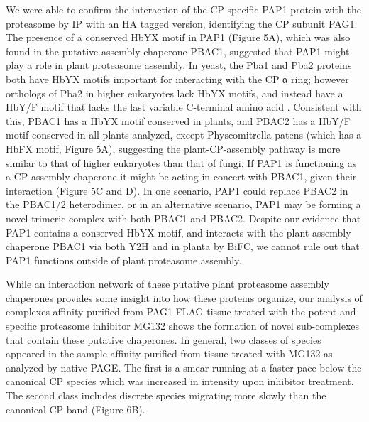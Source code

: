 We were able to confirm the interaction of the CP-specific PAP1 protein with the proteasome by IP with an HA tagged version, identifying the CP subunit PAG1. The presence of a conserved HbYX motif in PAP1 (Figure 5A), which was also found in the putative assembly chaperone PBAC1, suggested that PAP1 might play a role in plant proteasome assembly. In yeast, the Pba1 and Pba2 proteins both have HbYX motifs important for interacting with the CP α ring; however orthologs of Pba2 in higher eukaryotes lack HbYX motifs, and instead have a HbY/F motif that lacks the last variable C-terminal amino  acid \citep{kusmierczyk11}. Consistent with this, PBAC1 has a HbYX motif conserved in plants, and PBAC2 has a HbY/F motif conserved in all plants analyzed, except Physcomitrella patens (which has a HbFX motif, Figure 5A), suggesting the plant-CP-assembly pathway is more similar to that of higher eukaryotes than that of fungi. If PAP1 is functioning as a CP assembly chaperone it might be acting in concert with PBAC1, given their interaction (Figure 5C and D). In one scenario, PAP1 could replace PBAC2 in the PBAC1/2 heterodimer, or in an alternative scenario, PAP1 may be forming a novel trimeric complex with both PBAC1 and PBAC2. Despite our evidence that PAP1 contains a conserved HbYX motif, and interacts with the plant assembly chaperone PBAC1 via both Y2H and in planta by BiFC, we cannot rule out that PAP1 functions outside of plant proteasome assembly.

While an interaction network of these putative plant proteasome assembly chaperones provides some insight into how these proteins organize, our analysis of complexes affinity purified from PAG1-FLAG tissue treated with the potent and specific proteasome inhibitor MG132 shows the formation of novel sub-complexes that contain these putative chaperones. In general, two classes of species appeared in the sample affinity purified from tissue treated with MG132 as analyzed by native-PAGE. The first is a smear running at a faster pace below the canonical CP species which was increased in intensity upon inhibitor treatment. The second class includes discrete species migrating more slowly than the canonical CP band (Figure 6B). 

